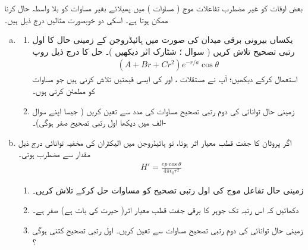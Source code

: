 بعض اوقات  کو غیر مضطرب تفاعلات موج ( مساوات ) میں پھیلائے بغیر مساوات  کو بلا واسطہ حال کرنا ممکن ہوتا ہے۔ اسکی دو خوبصورت مثالیں درج ذیل ہیں۔
\begin{enumerate}[a.]
\item
 \begin{enumerate}[1.]
 \item
 یکساں بیرونی برقی میدان  کی صورت میں ہائیڈروجن کے زمینی حال کا اول رتبی تصحیح تلاش کریں ( سوال ؛ شٹارک اثر دیکھیں )۔ حل کا درج ذیل روپ 
\begin{align*}
(A+Br+Cr^{2})e^{-r/a}\cos\theta
\end{align*}
استعمال کرکے دیکھیں؛ آپ نے مستقلات  ، اور  کی ایسی قیمتیں تلاش کرنی ہیں جو مساوات  کو مطمئن کرتی ہوں۔
\item
 زمینی حال توانائی کی دوم رتبی تصحیح مساوات  کی مدد سے تعین کریں ( جیسا اپنے سوال -الف میں دیکھا اول رتبی تصحیح صفر ہوگی)۔ 
\end{enumerate}
\item
 اگر پروٹان کا  جفت قطب معیار اثر  ہوتا، تو ہائیڈروجن میں الیکٹران کی مخفیہ توانائی درج ذیل مقدار سے مضطرب ہوتی۔
\begin{align*}
H'=\frac{ep\cos\theta}{4\pi\epsilon _0r^{2}}
\end{align*}
\begin{enumerate}[1.]
\item
 زمینی حال تفاعل موج کی اول رتبی تصحیح کو مساوات  حل کرکے تلاش کریں۔
\item
 دکھائیں کہ اس رتبہ تک جوہر کا  برقی جفت قطب معیار اثر( حیرت کی بات ہے) صفر ہے۔ 
\item
 زمینی حال توانائی کی دوم رتبی تصحیح مساوات  سے تعین کریں۔ اول رتبی تصحیح کتنی ہوگی ؟
\end{enumerate}
\end{enumerate}

